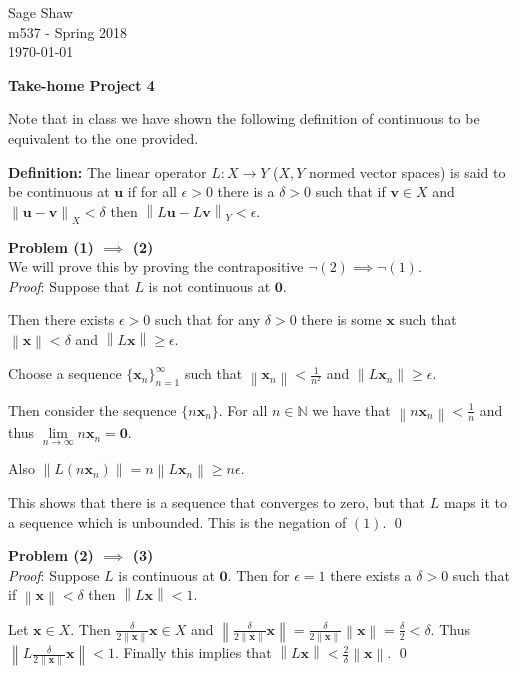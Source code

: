 \documentclass[12pt]{article}
\newcommand{\problem}[1]{\hspace{-4 ex} \large \textbf{Problem #1} }
\newcommand{\norm}[1]{\left\lVert#1\right\rVert}
\renewenvironment{proof}{\hspace{-4 ex} \emph{Proof}:}{\qed}
\newcommand{\NN}{\mathbb{N}}
\renewcommand{\vec}[1]{\boldsymbol{#1}}
\begin{document}
	\thispagestyle{empty}
	
	\begin{flushright}
		Sage Shaw \\
		m537 - Spring 2018 \\
		\today
	\end{flushright}
	
{\large \textbf{Take-home Project 4}}\bigbreak

Note that in class we have shown the following definition of continuous to be equivalent to the one provided.

\textbf{Definition:} The linear operator $L: X \to Y$ ($X,Y$ normed vector spaces) is said to be continuous at $\vec{u}$ if for all $\epsilon > 0$ there is a $\delta > 0$ such that if $\vec{v} \in X$ and $\norm{\vec{u} - \vec{v}}_X < \delta$ then $\norm{L\vec{u} - L\vec{v}}_Y < \epsilon$.

\problem{(1) $\implies$ (2)} \\
We will prove this by proving the contrapositive $\neg(2) \implies \neg(1)$. \\
\begin{proof}
	Suppose that $L$ is not continuous at $\vec{0}$.
	
	
	
	Then there exists $\epsilon > 0$ such that for any $\delta > 0$ there is some $\vec{x}$ such that $\norm{\vec{x}}< \delta$ and $\norm{L\vec{x}}\geq \epsilon$. 
	
	Choose a sequence $\{\vec{x}_n\}_{n=1}^\infty$ such that $\norm{\vec{x}_n}< \frac{1}{n^2}$ and $\norm{L\vec{x}_n} \geq \epsilon$. 
	
	Then consider the sequence $\{n\vec{x}_n\}$. For all $n \in \NN$ we have that $\norm{n\vec{x}_n}< \frac{1}{n}$ and thus $\lim\limits_{n\to \infty} n\vec{x}_n = \vec{0}$. 
	
	Also $\norm{L(n\vec{x}_n)} = n \norm{L\vec{x}_n} \geq n\epsilon$. \bigbreak
	
	This shows that there is a sequence that converges to zero, but that $L$ maps it to a sequence which is unbounded. This is the negation of $(1)$.	
\end{proof}

\problem{(2) $\implies$ (3)} \\
\begin{proof}
	Suppose $L$ is continuous at $\vec{0}$. Then for $\epsilon=1$ there exists a $\delta >0$ such that if $\norm{\vec{x}}<\delta$ then $\norm{L\vec{x}}<1$. \bigbreak
	
	Let $\vec{x} \in X$. Then $\frac{\delta}{2\norm{\vec{x}}}\vec{x} \in X$ and $\norm{\frac{\delta}{2\norm{\vec{x}}}\vec{x}} = \frac{\delta}{2\norm{\vec{x}}}\norm{\vec{x}} = \frac{\delta}{2} < \delta$. Thus $\norm{L\frac{\delta}{2\norm{\vec{x}}}\vec{x}} < 1$. Finally this implies that $\norm{L\vec{x}} < \frac{2}{\delta}\norm{\vec{x}}$.
\end{proof}
\end{document}
